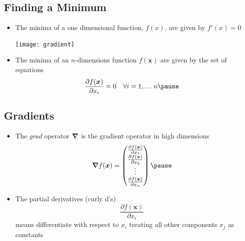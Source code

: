 \documentclass[25pt,landscape,footrule]{foils}
\begin{document}

\begin{slide}
\section[-2]{Finding a Minimum}

\begin{PauseHighLight}
  \begin{itemize}
  \item The minima of a one dimensional function, $f(x)$, are given by
    $f'(x)=0$
    \begin{center}
      \texttt{[image: gradient]}\pause
    \end{center}
  \item The minima of an $n$-dimensions function $f(\bm{x})$ are
    given by the set of equations
    \begin{align*}
      \frac{\partial f(\bm{x})}{\partial x_i}=0 
      \quad \forall i=1,\ldots n\pause
    \end{align*}
  \end{itemize}
\end{PauseHighLight}

\end{slide}


\begin{slide}
  \section[-1]{Gradients}

  \begin{PauseHighLight}

    \begin{itemize}
    \item The \emph{grad} operator $\bm{\nabla}$ is the gradient operator in
      high dimensions
      \begin{displaymath}
        \grad f(\bm{x}) = 
        \begin{pmatrix}
          \frac{\partial f(\bm{x})}{\partial x_1} \\
          \frac{\partial f(\bm{x})}{\partial x_2} \\
          \vdots \\
          \frac{\partial f(\bm{x})}{\partial x_n}
        \end{pmatrix}\pause
      \end{displaymath}
    \item The partial derivatives (curly d's)
      \begin{displaymath}
        \frac{\partial f(\bm{x})}{\partial x_i}
      \end{displaymath}
      means differentiate with respect to $x_i$ treating all other components
      $x_j$ as constants\pause
    \end{itemize}

  \end{PauseHighLight}
\end{slide}
\end{document}
